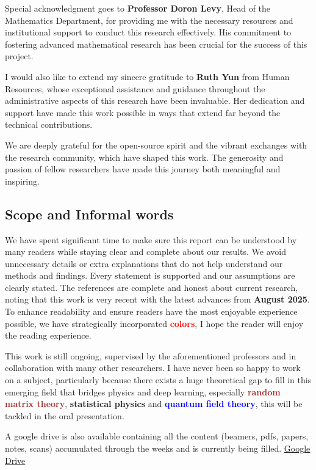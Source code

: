 \documentclass[a4paper]{article}
\theoremstyle{plain}
\theoremstyle{definition}
\theoremstyle{remark}
\begin{document}
Special acknowledgment goes to \textbf{Professor Doron Levy}, Head of the Mathematics Department, for providing me with 
the necessary resources and institutional support to conduct this research effectively. His commitment to fostering advanced 
mathematical research has been crucial for the success of this project.

I would also like to extend my sincere gratitude to \textbf{Ruth Yun} from Human Resources, whose exceptional assistance and guidance throughout the administrative aspects of this research have been invaluable. Her dedication and support have made this work possible in ways that extend far beyond the technical contributions.


We are deeply grateful for the open-source spirit and the vibrant exchanges with the research community, which have shaped this work. The generosity and passion of fellow researchers have made this journey both meaningful and inspiring.


\subsection*{Scope and Informal words}

We have spent significant time to make sure this report can be understood by many readers while staying clear and complete about our results. We avoid unnecessary details or extra explanations that do not help understand our methods and findings. 
Every statement is supported and our assumptions are clearly stated. The references are complete and honest about current research, 
noting that this work is very recent with the latest advances from \textbf{August 2025}.
To enhance readability and ensure readers have the most enjoyable experience possible, we have strategically 
incorporated \textbf{\textcolor{red}{colors}}, I hope the reader will enjoy the reading experience.

This work is still ongoing, supervised by the aforementioned professors and in collaboration with many other researchers.
 I have never been so happy to work on a subject,
particularly because there exists a huge theoretical gap to fill in this emerging field that bridges physics and deep learning,
especially \textbf{\textcolor{brown}{random matrix theory}}, \textbf{\textcolor{darkyellow}{statistical physics}} and \textbf{\textcolor{blue}{quantum field theory}}, this will be tackled in the oral presentation.


A google drive is also available containing all the content (beamers, pdfs, papers, notes, scans) accumulated through the weeks and is currently being filled.
\href{https://drive.google.com/drive/folders/1LFZ4euJO-KIWSFljtm5P4ebUBkkH_YPn}{Google Drive}
\end{document}
